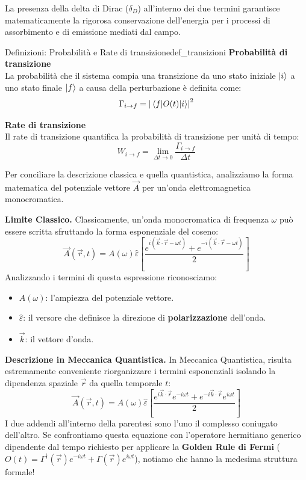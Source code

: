 La presenza della delta di Dirac (\( \delta_D \)) all'interno dei due termini garantisce matematicamente la rigorosa conservazione dell'energia per i processi di assorbimento e di emissione mediati dal campo.

\begin{note}{Definizioni: Probabilità e Rate di transizione}{def_transizioni}
    \textbf{Probabilità di transizione} \\
    La probabilità che il sistema compia una transizione da uno stato iniziale \(\ket{i}\) a uno stato finale \(\ket{f}\) a causa della perturbazione è definita come:
    \begin{equation}
        \Gamma_{i \to f} = \abs{\mel{f}{O(t)}{i}}^2
    \end{equation}

    \textbf{Rate di transizione} \\
    Il rate di transizione quantifica la probabilità di transizione per unità di tempo:
    \begin{equation}
         W_{i \to f}= \lim_{\Delta t \to 0} \frac{\Gamma_{i \to f}}{\Delta t}
    \end{equation}
\end{note}

Per conciliare la descrizione classica e quella quantistica, analizziamo la forma matematica del potenziale vettore \(\vec{A}\) per un'onda elettromagnetica monocromatica.

\textbf{Limite Classico.} Classicamente, un'onda monocromatica di frequenza \(\omega\) può essere scritta sfruttando la forma esponenziale del coseno:
\begin{equation}
    \vec{A}(\vec{r}, t) = A(\omega) \hat{\varepsilon} \left[ \frac{e^{i(\vec{k} \cdot \vec{r} - \omega t)} + e^{-i(\vec{k} \cdot \vec{r} - \omega t)}}{2} \right]
\end{equation}
Analizzando i termini di questa espressione riconosciamo:
\begin{itemize}
    \item \(A(\omega)\): l'ampiezza del potenziale vettore.
    \item \(\hat{\varepsilon}\): il versore che definisce la direzione di \textbf{polarizzazione} dell'onda.
    \item \(\vec{k}\): il vettore d'onda.
\end{itemize}

\textbf{Descrizione in Meccanica Quantistica.} In Meccanica Quantistica, risulta estremamente conveniente riorganizzare i termini esponenziali isolando la dipendenza spaziale \(\vec{r}\) da quella temporale \(t\):
\begin{equation}
    \vec{A}(\vec{r}, t) = A(\omega) \hat{\varepsilon} \left[ \frac{e^{i\vec{k} \cdot \vec{r}} e^{-i\omega t} + e^{-i\vec{k} \cdot \vec{r}} e^{i\omega t}}{2} \right]
\end{equation}
I due addendi all'interno della parentesi sono l'uno il complesso coniugato dell'altro. 
Se confrontiamo questa equazione con l'operatore hermitiano generico dipendente dal tempo richiesto per applicare la \textbf{Golden Rule di Fermi} (\(O(t) = \Gamma^\dagger(\vec{r})e^{-i\omega t} + \Gamma(\vec{r})e^{i\omega t}\)), notiamo che hanno la medesima struttura formale!


